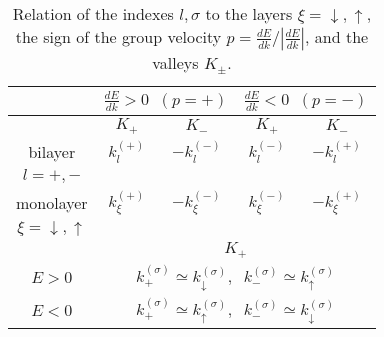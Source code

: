 \documentclass{jpsj3}
\begin{document}
\begin{table}
\begin{tabular}{c|c|c|c|c}
&
\multicolumn{2}{c|}{$\frac{dE}{dk} > 0\;\; (p=+)$} &
\multicolumn{2}{c}{$\frac{dE}{dk} < 0\;\; (p=-) $} \\
\hline
&$K_+$&$K_-$& $K_+$& $K_-$\\ 
\hline
bilayer & $k_l^{(+)}$ & $-k_l^{(-)}$ 
& $k_l^{(-)}$ & $-k_l^{(+)}$ 
\\
$l=+,-$ & & & & 
\\ \hline
monolayer & $k_\xi^{(+)}$ & $-k_\xi^{(-)}$ 
& $k_\xi^{(-)}$ & $-k_\xi^{(+)}$ 
\\
$\xi=\downarrow, \uparrow$ & & & &
\\ \hline
& \multicolumn{4}{c}{ $K_+$}
\\ \hline
$E >0$ &\multicolumn{4}{c}{$k_+^{(\sigma)}\simeq k^{(\sigma)}_\downarrow,
\;\; k_-^{(\sigma)}\simeq k^{(\sigma)}_\uparrow $ }
\\ \hline
$E <0$ &\multicolumn{4}{c}{$k_+^{(\sigma)}\simeq k^{(\sigma)}_\uparrow,
\;\; k_-^{(\sigma)}\simeq k^{(\sigma)}_\downarrow $ } \\
\end{tabular} 
\caption{ Relation of the indexes $l,\sigma$
to the layers $\xi= \downarrow,\uparrow$,  the sign of the group velocity $
p=\frac{dE}{dk}/\left|\frac{dE}{dk}\right|$, and the valleys $K_{\pm}$.
}
\end{table}
\end{document}
